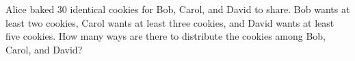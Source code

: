 Alice baked $30$ identical cookies for Bob, Carol, and David to share. Bob wants at least two cookies, Carol wants at least three cookies, and David wants at least five cookies. How many ways are there to distribute the cookies among Bob, Carol, and David?
